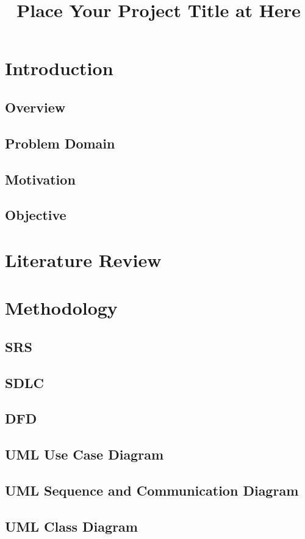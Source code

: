 \documentclass[12pt]{report}
\title{Place Your Project Title at Here}
\begin{document}
    
    \tableofcontents
  


\newpage
\chapter{Introduction}

\section{Overview}
\section{Problem Domain}
\section{Motivation}
\section{Objective}


\chapter{Literature Review}

\chapter{Methodology}
\section{SRS}
\section{SDLC}
\section{DFD}
\section{UML Use Case Diagram}
\section{UML Sequence and Communication Diagram}
\section{UML Class Diagram}
\end{document}
